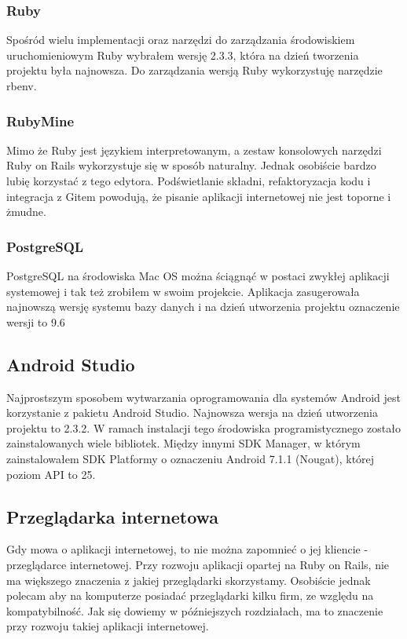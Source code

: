 \subsubsection{Ruby}
Spośród wielu implementacji oraz narzędzi do zarządzania środowiskiem uruchomieniowym Ruby wybrałem wersję 2.3.3, która na dzień tworzenia projektu była najnowsza. Do zarządzania wersją Ruby wykorzystuję narzędzie rbenv. 

\subsubsection{RubyMine}
Mimo że Ruby jest językiem interpretowanym, a zestaw konsolowych narzędzi Ruby on Rails wykorzystuje się w sposób naturalny. Jednak osobiście bardzo lubię korzystać z tego edytora. Podświetlanie składni, refaktoryzacja kodu i integracja z Gitem powodują, że pisanie aplikacji internetowej nie jest toporne i żmudne.

\subsubsection{PostgreSQL}
PostgreSQL na środowiska Mac OS można ściągnąć w postaci zwykłej aplikacji systemowej i tak też zrobiłem w swoim projekcie. Aplikacja zasugerowała najnowszą wersję systemu bazy danych i na dzień utworzenia projektu oznaczenie wersji to 9.6

\subsection{Android Studio}
Najprostszym sposobem wytwarzania oprogramowania dla systemów Android jest korzystanie z pakietu Android Studio. Najnowsza wersja na dzień utworzenia projektu to 2.3.2. W ramach instalacji tego środowiska programistycznego zostało zainstalowanych wiele bibliotek. Między innymi SDK Manager, w którym zainstalowałem SDK Platformy o oznaczeniu Android 7.1.1 (Nougat), której poziom API to 25.

\subsection{Przeglądarka internetowa}
Gdy mowa o aplikacji internetowej, to nie można zapomnieć o jej kliencie - przeglądarce internetowej. Przy rozwoju aplikacji opartej na Ruby on Rails, nie ma większego znaczenia z jakiej przeglądarki skorzystamy. Osobiście jednak polecam aby na komputerze posiadać przeglądarki kilku firm, ze względu na kompatybilność. Jak się dowiemy w późniejszych rozdziałach, ma to znaczenie przy rozwoju takiej aplikacji internetowej.

